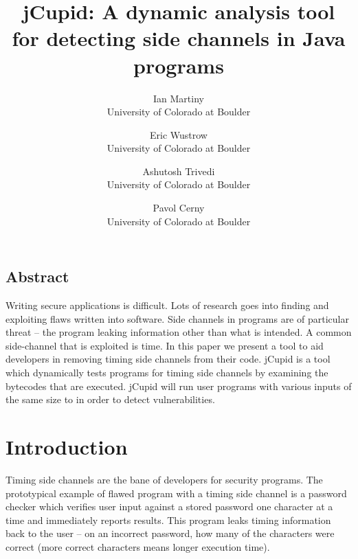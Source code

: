 \documentclass[letterpaper,twocolumn,10pt]{article}
\begin{document}
\date{}

\title{\Large \bf jCupid: A dynamic analysis tool for detecting side channels in Java programs}

\author{
{\rm Ian Martiny}\\
University of Colorado at Boulder
\and
{\rm Eric Wustrow}\\
University of Colorado at Boulder
\and
{\rm Ashutosh Trivedi}\\
University of Colorado at Boulder
\and
{\rm Pavol Cerny}\\
University of Colorado at Boulder
} %

\maketitle

\thispagestyle{empty}


\subsection*{Abstract}
Writing secure applications is difficult. Lots of research goes into finding and exploiting flaws written into software. Side channels in programs are of particular threat -- the program leaking information other than what is intended. A common side-channel that is exploited is time. In this paper we present a tool to aid developers in removing timing side channels from their code. jCupid is a tool which dynamically tests programs for timing side channels by examining the bytecodes that are executed. jCupid will run user programs with various inputs of the same size to in order to detect vulnerabilities.
\section{Introduction}

Timing side channels are the bane of developers for security programs. The prototypical example of flawed program with a timing side channel is a password checker which verifies user input against a stored password one character at a time and immediately reports results. This program leaks timing information back to the user -- on an incorrect password, how many of the characters were correct (more correct characters means longer execution time).
\end{document}

